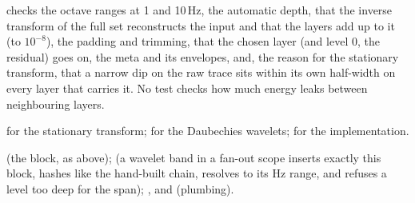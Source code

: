  checks the octave ranges at 1 and 10\,Hz, the
automatic depth, that the inverse transform of the full set reconstructs the input and that the
layers add up to it (to $10^{-8}$), the padding and trimming, that the chosen layer (and level
0, the residual) goes on, the meta and its envelopes, and, the reason for the stationary
transform, that a narrow dip on the raw trace sits within its own half-width on every layer
that carries it. No test checks how much energy leaks between neighbouring layers.

\citet{nason1995stationary} for the stationary transform; \citet{daubechies1992ten} for the
Daubechies wavelets; \citet{lee2019pywavelets} for the implementation.

 (the block, as above);
 (a wavelet band in a fan-out scope inserts exactly this
block, hashes like the hand-built chain, resolves to its Hz range, and refuses a level too deep
for the span); ,  and
 (plumbing).
